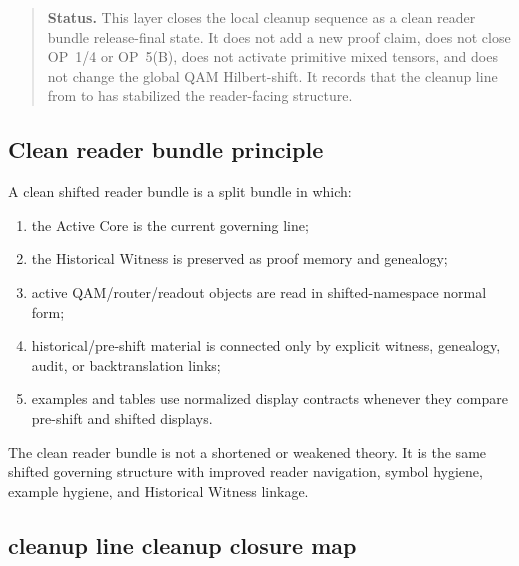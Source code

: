 \begin{quote}\small
\noindent\textbf{Status.}
This  layer closes the local cleanup sequence as a clean reader
bundle release-final state. It does not add a new proof claim, does not close OP~1/4 or
OP~5(B), does not activate primitive mixed tensors, and does not change the
 global QAM Hilbert-shift. It records that the cleanup line from
 to  has stabilized the reader-facing structure.
\end{quote}

\subsection{Clean reader bundle principle}
\label{subsec:v406-clean-reader-bundle-principle}

\begin{definition}
\label{def:v406-clean-reader-bundle-principle}
A clean shifted reader bundle is a split bundle in which:
\begin{enumerate}[leftmargin=*]
 \item the Active Core is the current governing line;
 \item the Historical Witness is preserved as proof memory and genealogy;
 \item active QAM/router/readout objects are read in shifted-namespace normal form;
 \item historical/pre-shift material is connected only by explicit witness,
 genealogy, audit, or backtranslation links;
 \item examples and tables use normalized display contracts whenever they
 compare pre-shift and shifted displays.
\end{enumerate}
\end{definition}

\begin{remark}
\label{rem:v406-clean-bundle-not-shorter-theory}
The clean reader bundle is not a shortened or weakened theory. It is the same
shifted governing structure with improved reader navigation, symbol hygiene,
example hygiene, and Historical Witness linkage.
\end{remark}

\subsection{cleanup line cleanup closure map}
\label{subsec:v406-cleanup-closure-map}

